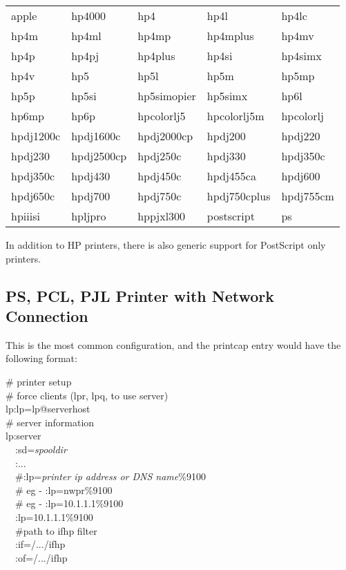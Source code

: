 \documentclass[a4paper]{article}
\begin{document}
\begin{center}
\begin{tabular}{l l l l l}
apple &  hp4000 &  hp4 &  hp4l &  hp4lc \\ 
hp4m &  hp4ml &  hp4mp &  hp4mplus &  hp4mv \\ 
hp4p &  hp4pj &  hp4plus &  hp4si &  hp4simx \\ 
hp4v &  hp5 &  hp5l &  hp5m &  hp5mp \\ 
hp5p &  hp5si &  hp5simopier &  hp5simx &  hp6l \\ 
hp6mp &  hp6p &  hpcolorlj5 &  hpcolorlj5m &  hpcolorlj \\ 
hpdj1200c &  hpdj1600c &  hpdj2000cp &  hpdj200 &  hpdj220 \\ 
hpdj230 &  hpdj2500cp &  hpdj250c &  hpdj330 &  hpdj350c \\ 
hpdj350c &  hpdj430 &  hpdj450c &  hpdj455ca &  hpdj600 \\ 
hpdj650c &  hpdj700 &  hpdj750c &  hpdj750cplus &  hpdj755cm \\ 
hpiiisi &  hpljpro &  hppjxl300 &  postscript &  ps \\ 
\end{tabular}
\end{center}




In addition to HP printers,
there is also generic support for PostScript only printers.


\subsection{PS, PCL, PJL Printer with Network Connection}

This is the most common configuration,
and the printcap entry would have the following format:
\begin{tscreen}
\# printer setup  \\ 
\#  force clients (lpr, lpq, to use server)  \\ 
lp:lp=lp@serverhost  \\ 
\# server information  \\ 
lp:server  \\ 
~~:sd={\itshape spooldir\/}  \\ 
~~:...  \\ 
~~\#:lp={\itshape printer ip address or DNS name\/}\%9100 \\ 
~~\# eg - :lp=nwpr\%9100 \\ 
~~\# eg - :lp=10.1.1.1\%9100 \\ 
~~:lp=10.1.1.1\%9100 \\ 
~~\#path to ifhp filter  \\ 
~~:if=/.../ifhp  \\ 
~~:of=/.../ifhp
\end{tscreen}
\end{document}
